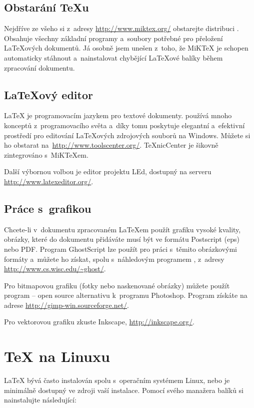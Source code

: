 \subsection{Obstarání \TeX u}

Nejdříve ze všeho si z~adresy \url{http://www.miktex.org/} obstarejte distribuci
. Obsahuje všechny základní programy a~soubory potřebné
pro přeložení \LaTeX ových dokumentů. Já osobně jsem unešen z~toho,
že MiK\TeX{} je schopen automaticky stáhnout a~nainstalovat chybějící \LaTeX ové balíky
během zpracování dokumentu.

\subsection{\LaTeX ový editor}

\LaTeX{} je programovacím jazykem pro textové dokumenty. 
používá mnoho konceptů z~programovacího světa a~díky tomu poskytuje
elegantní a~efektivní prostředí pro editování \LaTeX ových zdrojových
souborů na Windows. Můžete si ho obstarat na~\url{http://www.toolscenter.org/}.
\TeX nicCenter je šikovně zintegrováno s~MiK\TeX em.

Další výbornou volbou je editor projektu LEd, dostupný na serveru \url{http://www.latexeditor.org/}.

\subsection{Práce s~grafikou}

Chcete-li v~dokumentu zpracovaném \LaTeX em použít grafiku vysoké kvality,
obrázky, které do dokumentu přidáváte musí být ve formátu Postscript (eps)
nebo PDF. Program GhostScript lze použít pro práci s~těmito obrázkovými formáty
a~můžete ho získat, spolu s~náhledovým programem , z~adresy
\url{http://www.cs.wisc.edu/~ghost/}.

Pro bitmapovou grafiku (fotky nebo naskenované obrázky)
můžete použít program  -- open source alternativu k~programu
Photoshop. Program získáte na adrese \url{http://gimp-win.sourceforge.net/}.

Pro vektorovou grafiku zkuste Inkscape, \url{http://inkscape.org/}.

\section{\TeX{} na Linuxu}

\LaTeX{} bývá často instalován spolu s~operačním systémem Linux, nebo je
minimálně dostupný ve zdroji vaší instalace. Pomocí svého manažera balíků
si nainstalujte následující:

